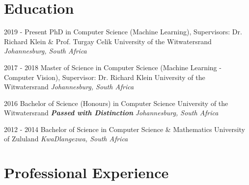 \documentclass[11pt, letterpaper]{moderncv}        %
\begin{document}
\makecvtitle

\section{Education}
\cventry
{2019 - Present}
{PhD in Computer Science (Machine Learning), Supervisors: Dr. Richard Klein \& Prof. Turgay Celik}
{University of the Witwatersrand}
{}
{\textit{Johannesburg, South Africa}}
{}

\cventry
{2017 - 2018}
{Master of Science in Computer Science (Machine Learning - Computer Vision), Supervisor: Dr. Richard Klein}
{University of the Witwatersrand}
{}
{\textit{Johannesburg, South Africa}}
{}

\cventry
{2016}
{Bachelor of Science (Honours) in Computer Science}
{University of the Witwatersrand}
{\textbf{\textit{Passed with Distinction}}}
{\textit{Johannesburg, South Africa}}
{}

\cventry
{2012 - 2014}
{Bachelor of Science in Computer Science \& Mathematics}
{University of Zululand}
{}
{\textit{KwaDlangezwa, South Africa}}
{}


\section{Professional Experience}
\end{document}

